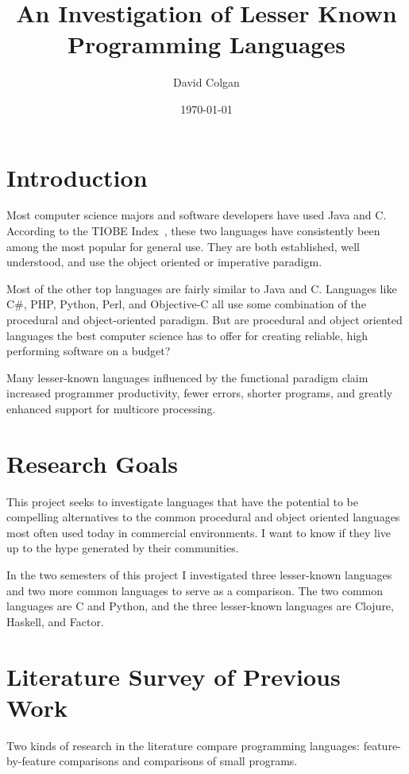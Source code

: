 \documentclass{article}
\title{An Investigation of Lesser Known Programming Languages}
\author{David Colgan}
\date{\today}
\begin{document}
\maketitle

\section{Introduction}

Most computer science majors and software developers have used Java and C.
According to the TIOBE Index~\cite{tiobe}, these two languages have
consistently been among the most popular for general use.  They are both
established, well understood, and use the object oriented or imperative
paradigm.

Most of the other top languages are fairly similar to Java and C.  Languages
like C\#, PHP, Python, Perl, and Objective-C all use some combination of the
procedural and object-oriented paradigm.   But are procedural and object
oriented languages the best computer science has to offer for creating
reliable, high performing software on a budget?

Many lesser-known languages influenced by the functional paradigm claim
increased programmer productivity, fewer errors, shorter programs, and greatly
enhanced support for multicore processing.

\section{Research Goals}

This project seeks to investigate languages that have the potential to be
compelling alternatives to the common procedural and object oriented languages
most often used today in commercial environments.  I want to know if they live
up to the hype generated by their communities.

In the two semesters of this project I investigated three lesser-known languages
and two more common languages to serve as a comparison.  The two common
languages are C and Python, and the three lesser-known languages are Clojure,
Haskell, and Factor.  

\section{Literature Survey of Previous Work}
\label{sec:survey}

Two kinds of research in the literature compare programming languages:
feature-by-feature comparisons and comparisons of small programs.
\end{document}
